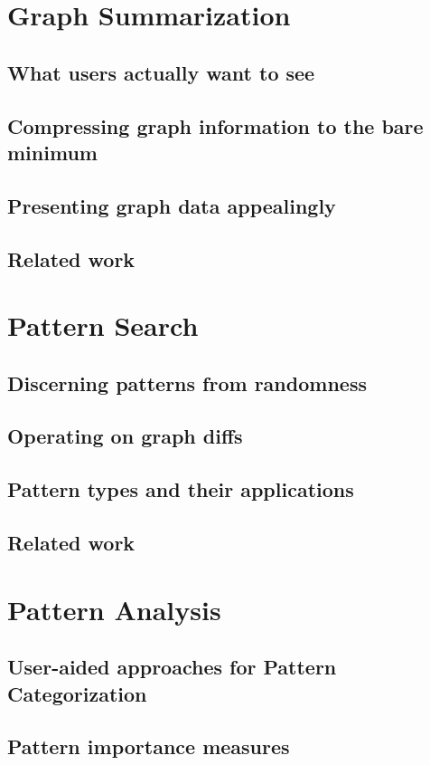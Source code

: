 \documentclass[
        a4paper,     %
        titlepage,   %
        twoside,     %
        parskip      %
        ]{scrartcl}  %
\begin{document}
  \section{Graph Summarization}
    \subsection{What users actually want to see}
    \subsection{Compressing graph information to the bare minimum}
    \subsection{Presenting graph data appealingly}
    \subsection{Related work}
    \pagebreak

  \section{Pattern Search}
    \subsection{Discerning patterns from randomness}
    \subsection{Operating on graph diffs}
    \subsection{Pattern types and their applications}
    \subsection{Related work}
    \pagebreak

  \section{Pattern Analysis}
    \subsection{User-aided approaches for Pattern Categorization}
    \subsection{Pattern importance measures}
\end{document}
